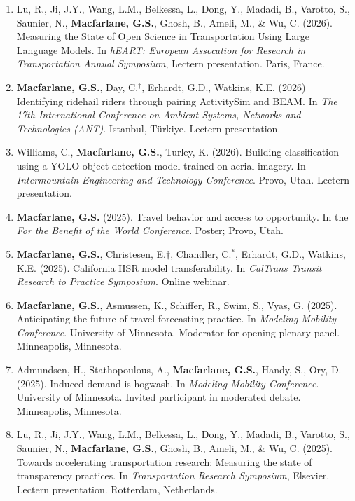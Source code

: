 \documentclass[margin,line]{res}
\newif\ifdetail{}
\newcounter{enuminitialize}
\newenvironment{myenum}[1][]
{%
 \setcounter{enuminitialize}{#1}
 \addtocounter{enuminitialize}{2}
 \begin{enumerate}[left= 4pt, itemsep=8pt, start=\value{enuminitialize}, label=\arabic*\addtocounter{enumi}{-2}]
}
{%
 \end{enumerate}
}
\begin{document}
\begin{resume}
\begin{myenum}[45]
 \ifdetail{\color{NavyBlue} \fi
\item Lu, R., Ji, J.Y., Wang, L.M., Belkessa, L., Dong, Y., Madadi, B., Varotto, S., Saunier, N., \textbf{Macfarlane, G.S.}, Ghosh, B., Ameli, M., \& Wu, C. (2026).  Measuring the State of Open Science in Transportation Using Large Language Models. In \textit{hEART: European Assocation for Research in Transportation Annual Symposium}, Lectern presentation. Paris, France.
\item \textbf{Macfarlane, G.S.}, Day, C.$^\dagger$,  Erhardt, G.D., Watkins, K.E. (2026) Identifying ridehail riders through pairing ActivitySim and BEAM. In \textit{The 17th International Conference on Ambient Systems, Networks and Technologies (ANT)}. Istanbul, T\"urkiye. Lectern presentation.
\item Williams, C., \textbf{Macfarlane, G.S.}, Turley, K. (2026). Building classification using a YOLO object detection model trained on aerial imagery. In \textit{Intermountain Engineering and Technology Conference}. Provo, Utah. Lectern presentation.
 \ifdetail } \fi
\item \textbf{Macfarlane, G.S.} (2025). Travel behavior and access to opportunity. In the \textit{For the Benefit of the World Conference}. Poster; Provo, Utah.
\item \textbf{Macfarlane, G.S.}, Christesen, E.$\dagger$, Chandler, C.$^*$, Erhardt, G.D., Watkins, K.E. (2025). California HSR model transferability. In \textit{CalTrans Transit Research to Practice Symposium}. Online webinar.
\item \textbf{Macfarlane, G.S.}, Asmussen, K., Schiffer, R., Swim, S., Vyas, G. (2025). Anticipating the future of travel forecasting practice. In \textit{Modeling Mobility Conference}. University of Minnesota. Moderator for opening plenary panel. Minneapolis, Minnesota.
\item Admundsen, H., Stathopoulous, A., \textbf{Macfarlane, G.S.}, Handy, S., Ory, D. (2025). Induced demand is hogwash. In \textit{Modeling Mobility Conference}. University of Minnesota. Invited participant in moderated debate. Minneapolis, Minnesota.
\item Lu, R., Ji, J.Y., Wang, L.M., Belkessa, L., Dong, Y., Madadi, B., Varotto, S., Saunier, N., \textbf{Macfarlane, G.S.}, Ghosh, B., Ameli, M., \& Wu, C. (2025).  Towards accelerating transportation research: Measuring the state of transparency practices. In \textit{Transportation Research Symposium}, Elsevier. Lectern presentation. Rotterdam, Netherlands.

\end{myenum}
\end{resume}
\end{document}
